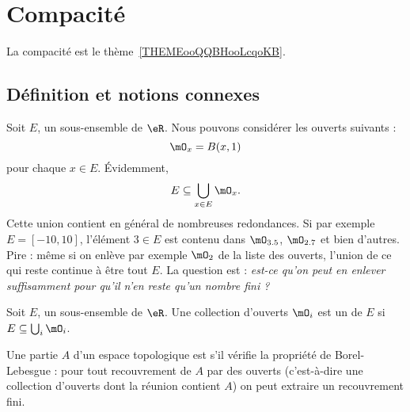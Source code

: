 \section{Compacité}

La compacité est le thème~\ref{THEMEooQQBHooLcqoKB}.

\subsection{Définition et notions connexes}

Soit $E$, un sous-ensemble de $\eR$. Nous pouvons considérer les ouverts suivants :
\begin{equation}
    \mO_x=B(x,1)
\end{equation}
pour chaque $x\in E$. Évidemment,
\begin{equation}
    E\subseteq \bigcup_{x\in E}\mO_x.
\end{equation}
Cette union contient en général de nombreuses redondances. Si par exemple $E=[-10,10]$, l'élément $3\in E$ est contenu dans $\mO_{3.5}$, $\mO_{2.7}$ et bien d'autres. Pire : même si on enlève par exemple $\mO_2$ de la liste des ouverts, l'union de ce qui reste continue à être tout $E$. La question est : \emph{est-ce qu'on peut en enlever suffisamment pour qu'il n'en reste qu'un nombre fini ?}

\begin{definition} 
Soit $E$, un sous-ensemble de $\eR$. Une collection d'ouverts $\mO_i$ est un  de $E$ si $E\subseteq \bigcup_{i}\mO_i$.
\end{definition}

\begin{definition} \label{DefJJVsEqs}
    Une partie $A$ d'un espace topologique est  s'il vérifie la propriété de Borel-Lebesgue : pour tout recouvrement de $A$ par des ouverts (c'est-à-dire une collection d'ouverts dont la réunion contient $A$) on peut extraire un recouvrement fini.
\end{definition}

